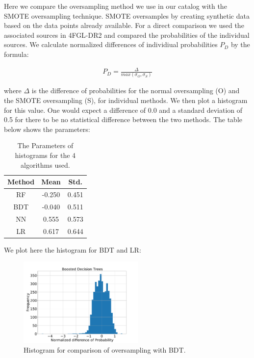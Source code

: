 Here we compare the oversampling method we use in our catalog with the SMOTE oversampling technique. SMOTE oversamples by creating synthetic data based on the data points already available. For a direct comparison we used the associated sources in 4FGL-DR2 and compared the probabilities of the individual sources. We calculate normalized differences of individiual probabilities $P_{D}$ by the formula:

\begin{align}
P_{D}= \frac{\Delta}{max(\sigma_{O},\sigma_{S})}
\end{align}

where $\Delta$ is the difference of probabilities for the normal oversampling (O) and the SMOTE oversampling (S), for individual methods. We then plot a histogram for this value. One would expect a difference of 0.0 and a standard deviation of 0.5 for there to be no statistical difference between the two methods. The table below shows the parameters:
\begin{table}[!h]
\tiny
\centering
\renewcommand{\tabcolsep}{1mm}
\renewcommand{\arraystretch}{1}

\begin{tabular}{c c c}
\hline
\hline
Method & Mean&Std.\\
\hline
RF& -0.250 & 0.451\\
\hline
BDT&-0.040&0.511 \\
\hline
NN&0.555&0.573\\
\hline
LR&0.617&0.644\\
\end{tabular}
\vspace{2mm}
\caption{The Parameters of histograms for the 4 algorithms used.
}
\label{tab:compO}
\end{table}

We plot here the histogram for BDT and LR:
\begin{figure}[h]
\centering
\hspace*{-1cm}
\includegraphics[width=0.55\textwidth]{plots/diffBDT2.pdf}
\caption{Histogram for comparison of oversampling with BDT.
}
\label{fig:nn_nn}
\end{figure}

